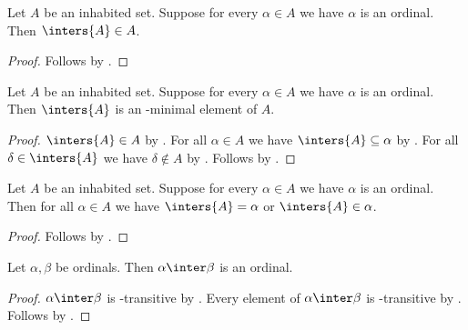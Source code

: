 \begin{proposition}\label{inters_of_ordinals_elem}
    Let $A$ be an inhabited set.
    Suppose for every $\alpha\in A$ we have $\alpha$ is an ordinal.
    Then $\inters{A}\in A$.
\end{proposition}
\begin{proof}
    Follows by .
\end{proof}

\begin{proposition}\label{inters_of_ordinals_is_minimal}
    Let $A$ be an inhabited set.
    Suppose for every $\alpha\in A$ we have $\alpha$ is an ordinal.
    Then $\inters{A}$ is an \in-minimal element of $A$.
\end{proposition}
\begin{proof}
    $\inters{A}\in A$ by .
    For all $\alpha\in A$ we have $\inters{A}\subseteq \alpha$
        by .
    For all $\delta\in\inters{A}$ we have $\delta\notin A$
        by .
    Follows by .
\end{proof}

\begin{proposition}\label{inters_of_ordinals_is_minimal_alternate}
    Let $A$ be an inhabited set.
    Suppose for every $\alpha\in A$ we have $\alpha$ is an ordinal.
    Then for all $\alpha\in A$ we have $\inters{A} = \alpha$ or $\inters{A}\in\alpha$.
\end{proposition}
\begin{proof}
    Follows by .
\end{proof}

\begin{proposition}\label{inter_of_two_ordinals_is_ordinal}
    Let $\alpha,\beta$ be ordinals.
    Then $\alpha\inter\beta$ is an ordinal.
    \end{proposition}
\begin{proof}
    $\alpha\inter\beta$ is \in-transitive by .
    Every element of $\alpha\inter\beta$ is \in-transitive
        by .
    Follows by .
\end{proof}


